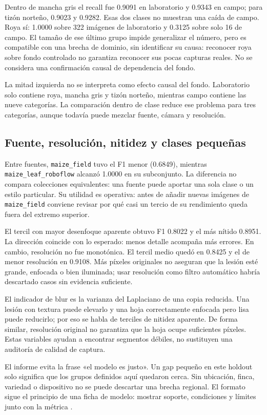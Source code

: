 Dentro de mancha gris el recall fue 0.9091 en laboratorio y 0.9343 en campo;
para tizón norteño, 0.9023 y 0.9282. Esas dos clases no muestran una caída de
campo. Roya sí: 1.0000 sobre 322 imágenes de laboratorio y 0.3125 sobre solo 16
de campo. El tamaño de ese último grupo impide generalizar el número, pero
es compatible con una brecha de dominio, sin identificar su causa: reconocer roya
sobre fondo controlado no garantiza reconocer sus pocas capturas reales. No se
considera una confirmación causal de dependencia del fondo.

La mitad izquierda no se interpreta como efecto causal del fondo. Laboratorio
solo contiene roya, mancha gris y tizón norteño, mientras campo contiene las
nueve categorías. La comparación dentro de clase reduce ese problema para tres
categorías, aunque todavía puede mezclar fuente, cámara y resolución.

\subsection{Fuente, resolución, nitidez y clases pequeñas}

Entre fuentes, \texttt{maize\_field} tuvo el F1 menor (0.6849), mientras
\texttt{maize\_leaf\_roboflow} alcanzó 1.0000 en su subconjunto. La diferencia
no compara colecciones equivalentes: una fuente puede aportar una sola clase o
un estilo particular. Su utilidad es operativa: antes de añadir nuevas imágenes
de \texttt{maize\_field} conviene revisar por qué casi un tercio de su rendimiento
queda fuera del extremo superior.

El tercil con mayor desenfoque aparente obtuvo F1 0.8022 y el más nítido 0.8951.
La dirección coincide con lo esperado: menos detalle acompaña más errores. En
cambio, resolución no fue monotónica. El tercil medio quedó en 0.8425 y el de
menor resolución en 0.9108. Más píxeles originales no aseguran que la lesión
esté grande, enfocada o bien iluminada; usar resolución como filtro automático
habría descartado casos sin evidencia suficiente.

El indicador de blur es la varianza del Laplaciano de una copia reducida. Una
lesión con textura puede elevarlo y una hoja correctamente enfocada pero lisa
puede reducirlo; por eso se habla de terciles de nitidez aparente. De forma
similar, resolución original no garantiza que la hoja ocupe suficientes
píxeles. Estas variables ayudan a encontrar segmentos débiles, no sustituyen
una auditoría de calidad de captura.

El informe evita la frase «el modelo es justo». Un gap pequeño en este holdout
solo significa que los grupos definidos aquí quedaron cerca. Sin ubicación,
finca, variedad o dispositivo no se puede descartar una brecha regional. El
formato sigue el principio de una ficha de modelo: mostrar soporte, condiciones
y límites junto con la métrica \citep{mitchell2019modelcards}.
